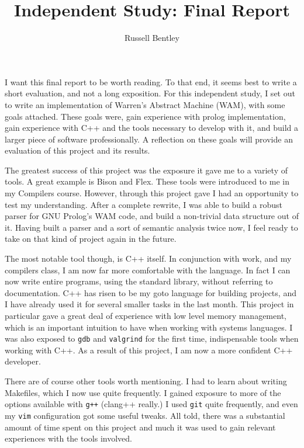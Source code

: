 \documentclass{article}
\begin{document}
\title{Independent Study: Final Report}
\author{Russell Bentley}
\maketitle
I want this final report to be worth reading. To that end, it seems best to write a short evaluation, and not a long exposition. For this independent study, I set out to write an implementation of Warren's Abstract Machine (WAM), with some goals attached. These goals were, gain experience with prolog implementation, gain experience with C++ and the tools necessary to develop with it, and build a larger piece of software professionally. A reflection on these goals will provide an evaluation of this project and its results.

The greatest success of this project was the exposure it gave me to a variety of tools. A great example is Bison and Flex. These tools were introduced to me in my Compilers course. However, through this project gave I had an opportunity to test my understanding. After a complete rewrite, I was able to build a robust parser for GNU Prolog's WAM code, and build a non-trivial data structure out of it. Having built a parser and a sort of semantic analysis twice now, I feel ready to take on that kind of project again in the future.

The most notable tool though, is C++ itself. In conjunction with work, and my compilers class, I am now far more comfortable with the language. In fact I can now write entire programs, using the standard library, without referring to documentation. C++ has risen to be my goto language for building projects, and I have already used it for several smaller tasks in the last month. This project in particular gave a great deal of experience with low level memory management, which is an important intuition to have when working with systems languages. I was also exposed to \verb!gdb! and \verb!valgrind! for the first time, indispensable tools when working with C++. As a result of this project, I am now a more confident C++ developer.

There are of course other tools worth mentioning. I had to learn about writing Makefiles, which I now use quite frequently. I gained exposure to more of the options available with \verb!g++! (clang++ really.) I used \verb!git! quite frequently, and even my \verb!vim! configuration got some useful tweaks. All told, there was a substantial amount of time spent on this project and much it was used to gain relevant experiences with the tools involved.
\end{document}
